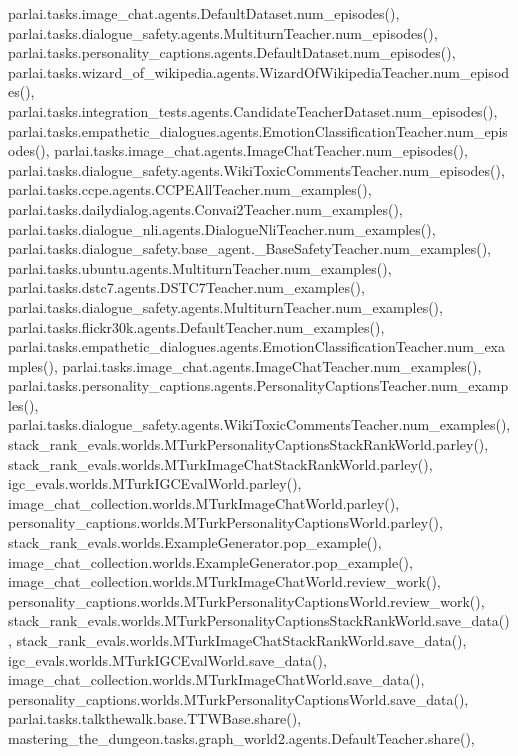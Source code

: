 parlai.\+tasks.\+image\+\_\+chat.\+agents.\+Default\+Dataset.\+num\+\_\+episodes(), parlai.\+tasks.\+dialogue\+\_\+safety.\+agents.\+Multiturn\+Teacher.\+num\+\_\+episodes(), parlai.\+tasks.\+personality\+\_\+captions.\+agents.\+Default\+Dataset.\+num\+\_\+episodes(), parlai.\+tasks.\+wizard\+\_\+of\+\_\+wikipedia.\+agents.\+Wizard\+Of\+Wikipedia\+Teacher.\+num\+\_\+episodes(), parlai.\+tasks.\+integration\+\_\+tests.\+agents.\+Candidate\+Teacher\+Dataset.\+num\+\_\+episodes(), parlai.\+tasks.\+empathetic\+\_\+dialogues.\+agents.\+Emotion\+Classification\+Teacher.\+num\+\_\+episodes(), parlai.\+tasks.\+image\+\_\+chat.\+agents.\+Image\+Chat\+Teacher.\+num\+\_\+episodes(), parlai.\+tasks.\+dialogue\+\_\+safety.\+agents.\+Wiki\+Toxic\+Comments\+Teacher.\+num\+\_\+episodes(), parlai.\+tasks.\+ccpe.\+agents.\+C\+C\+P\+E\+All\+Teacher.\+num\+\_\+examples(), parlai.\+tasks.\+dailydialog.\+agents.\+Convai2\+Teacher.\+num\+\_\+examples(), parlai.\+tasks.\+dialogue\+\_\+nli.\+agents.\+Dialogue\+Nli\+Teacher.\+num\+\_\+examples(), parlai.\+tasks.\+dialogue\+\_\+safety.\+base\+\_\+agent.\+\_\+\+Base\+Safety\+Teacher.\+num\+\_\+examples(), parlai.\+tasks.\+ubuntu.\+agents.\+Multiturn\+Teacher.\+num\+\_\+examples(), parlai.\+tasks.\+dstc7.\+agents.\+D\+S\+T\+C7\+Teacher.\+num\+\_\+examples(), parlai.\+tasks.\+dialogue\+\_\+safety.\+agents.\+Multiturn\+Teacher.\+num\+\_\+examples(), parlai.\+tasks.\+flickr30k.\+agents.\+Default\+Teacher.\+num\+\_\+examples(), parlai.\+tasks.\+empathetic\+\_\+dialogues.\+agents.\+Emotion\+Classification\+Teacher.\+num\+\_\+examples(), parlai.\+tasks.\+image\+\_\+chat.\+agents.\+Image\+Chat\+Teacher.\+num\+\_\+examples(), parlai.\+tasks.\+personality\+\_\+captions.\+agents.\+Personality\+Captions\+Teacher.\+num\+\_\+examples(), parlai.\+tasks.\+dialogue\+\_\+safety.\+agents.\+Wiki\+Toxic\+Comments\+Teacher.\+num\+\_\+examples(), stack\+\_\+rank\+\_\+evals.\+worlds.\+M\+Turk\+Personality\+Captions\+Stack\+Rank\+World.\+parley(), stack\+\_\+rank\+\_\+evals.\+worlds.\+M\+Turk\+Image\+Chat\+Stack\+Rank\+World.\+parley(), igc\+\_\+evals.\+worlds.\+M\+Turk\+I\+G\+C\+Eval\+World.\+parley(), image\+\_\+chat\+\_\+collection.\+worlds.\+M\+Turk\+Image\+Chat\+World.\+parley(), personality\+\_\+captions.\+worlds.\+M\+Turk\+Personality\+Captions\+World.\+parley(), stack\+\_\+rank\+\_\+evals.\+worlds.\+Example\+Generator.\+pop\+\_\+example(), image\+\_\+chat\+\_\+collection.\+worlds.\+Example\+Generator.\+pop\+\_\+example(), image\+\_\+chat\+\_\+collection.\+worlds.\+M\+Turk\+Image\+Chat\+World.\+review\+\_\+work(), personality\+\_\+captions.\+worlds.\+M\+Turk\+Personality\+Captions\+World.\+review\+\_\+work(), stack\+\_\+rank\+\_\+evals.\+worlds.\+M\+Turk\+Personality\+Captions\+Stack\+Rank\+World.\+save\+\_\+data(), stack\+\_\+rank\+\_\+evals.\+worlds.\+M\+Turk\+Image\+Chat\+Stack\+Rank\+World.\+save\+\_\+data(), igc\+\_\+evals.\+worlds.\+M\+Turk\+I\+G\+C\+Eval\+World.\+save\+\_\+data(), image\+\_\+chat\+\_\+collection.\+worlds.\+M\+Turk\+Image\+Chat\+World.\+save\+\_\+data(), personality\+\_\+captions.\+worlds.\+M\+Turk\+Personality\+Captions\+World.\+save\+\_\+data(), parlai.\+tasks.\+talkthewalk.\+base.\+T\+T\+W\+Base.\+share(), mastering\+\_\+the\+\_\+dungeon.\+tasks.\+graph\+\_\+world2.\+agents.\+Default\+Teacher.\+share(), 